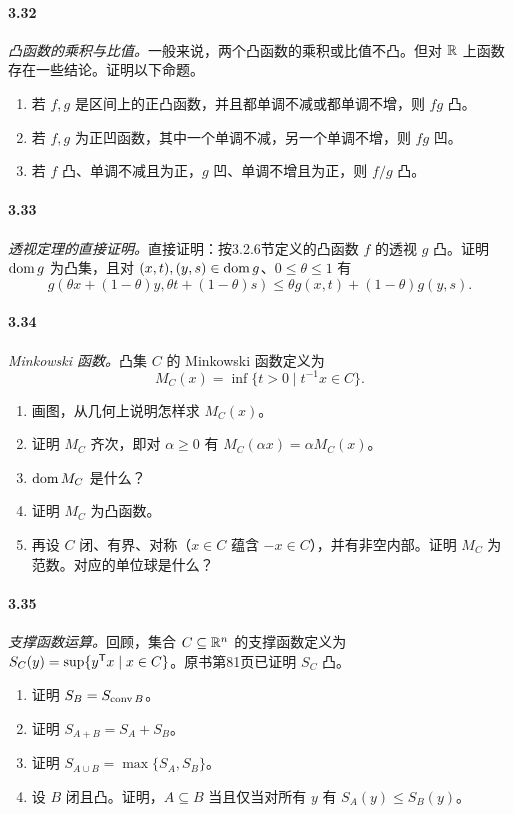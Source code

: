 \paragraph{3.32}\textit{凸函数的乘积与比值。}一般来说，两个凸函数的乘积或比值不凸。但对 $\mathbb R$ 上函数存在一些结论。证明以下命题。
\begin{enumerate}[label=(\alph*)]
\item 若 $f,g$ 是区间上的正凸函数，并且都单调不减或都单调不增，则 $fg$ 凸。
\item 若 $f,g$ 为正凹函数，其中一个单调不减，另一个单调不增，则 $fg$ 凹。
\item 若 $f$ 凸、单调不减且为正，$g$ 凹、单调不增且为正，则 $f/g$ 凸。
\end{enumerate}
\paragraph{3.33}\textit{透视定理的直接证明。}直接证明：按3.2.6节定义的凸函数 $f$ 的透视 $g$ 凸。证明 $\operatorname{dom} g$ 为凸集，且对 $(x,t),(y,s)\in\operatorname{dom} g$、$0\leq\theta\leq1$ 有
\[g(\theta x+(1-\theta)y,\theta t+(1-\theta)s)\leq\theta g(x,t)+(1-\theta)g(y,s).\]
\paragraph{3.34}\textit{Minkowski 函数。}凸集 $C$ 的 Minkowski 函数定义为
\[M_C(x)=\inf\{t>0\mid t^{-1}x\in C\}.\]
\begin{enumerate}[label=(\alph*)]
\item 画图，从几何上说明怎样求 $M_C(x)$。
\item 证明 $M_C$ 齐次，即对 $\alpha\geq0$ 有 $M_C(\alpha x)=\alpha M_C(x)$。
\item $\operatorname{dom} M_C$ 是什么？
\item 证明 $M_C$ 为凸函数。
\item 再设 $C$ 闭、有界、对称（$x\in C$ 蕴含 $-x\in C$），并有非空内部。证明 $M_C$ 为范数。对应的单位球是什么？
\end{enumerate}
\paragraph{3.35}\textit{支撑函数运算。}回顾，集合 $C\subseteq\mathbb R^n$ 的支撑函数定义为 $S_C(y)=\sup\{y^\mathsf T x\mid x\in C\}$。原书第81页已证明 $S_C$ 凸。
\begin{enumerate}[label=(\alph*)]
\item 证明 $S_B=S_{\operatorname{conv} B}$。
\item 证明 $S_{A+B}=S_A+S_B$。
\item 证明 $S_{A\cup B}=\max\{S_A,S_B\}$。
\item 设 $B$ 闭且凸。证明，$A\subseteq B$ 当且仅当对所有 $y$ 有 $S_A(y)\leq S_B(y)$。
\end{enumerate}
